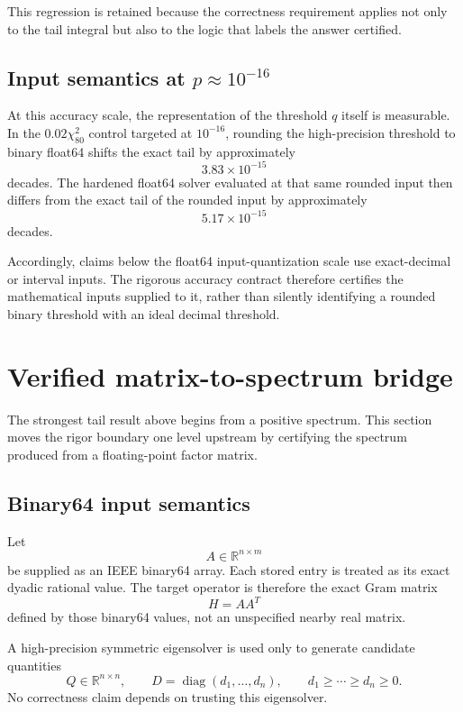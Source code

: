 \documentclass[11pt]{article}
\theoremstyle{definition}
\theoremstyle{remark}
\begin{document}
This regression is retained because the correctness requirement applies not
only to the tail integral but also to the logic that labels the answer
certified.

\subsection{Input semantics at \texorpdfstring{\(p\approx10^{-16}\)}{p about 1e-16}}

At this accuracy scale, the representation of the threshold \(q\) itself is
measurable.  In the \(0.02\chi^2_{80}\) control targeted at \(10^{-16}\),
rounding the high-precision threshold to binary float64 shifts the exact tail
by approximately
\[
3.83\times10^{-15}
\]
decades.  The hardened float64 solver evaluated at that same rounded input
then differs from the exact tail of the rounded input by approximately
\[
5.17\times10^{-15}
\]
decades.

Accordingly, claims below the float64 input-quantization scale use exact-decimal
or interval inputs.  The rigorous accuracy contract therefore certifies the
mathematical inputs supplied to it, rather than silently identifying a rounded
binary threshold with an ideal decimal threshold.


\section{Verified matrix-to-spectrum bridge}

The strongest tail result above begins from a positive spectrum.  This section
moves the rigor boundary one level upstream by certifying the spectrum produced
from a floating-point factor matrix.

\subsection{Binary64 input semantics}

Let
\[
A\in\mathbb R^{n\times m}
\]
be supplied as an IEEE binary64 array.  Each stored entry is treated as its
exact dyadic rational value.  The target operator is therefore the exact Gram
matrix
\[
H=AA^T
\]
defined by those binary64 values, not an unspecified nearby real matrix.

A high-precision symmetric eigensolver is used only to generate candidate
quantities
\[
Q\in\mathbb R^{n\times n},
\qquad
D=\operatorname{diag}(d_1,\ldots,d_n),
\qquad
d_1\ge\cdots\ge d_n\ge0.
\]
No correctness claim depends on trusting this eigensolver.
\end{document}
